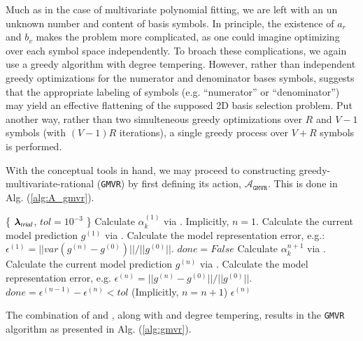 \documentclass[twocolumn,aps,prd,floatfix,preprintnumbers,a4paper,nofootinbib,
superscriptaddress,10pt]{revtex4-1}
\def\gmvr#1{greedy-multivariate-rational#1
  (\texttt{GMVR}#1)\gdef\gmvr{\texttt{GMVR}}}
\begin{document}
%
\par Much as in the case of multivariate polynomial fitting, we are left with an un unknown number and content of basis symbols.
%
In principle, the existence of $a_r$ and $b_v$ makes the problem more complicated, as one could imagine optimizing over each symbol space independently.
%
To broach these complications, we again use a greedy algorithm with degree tempering.
%
However, rather than independent greedy optimizations for the numerator and denominator bases symbols,  suggests that the appropriate labeling of symbols (e.g. ``numerator'' or ``denominator'') may yield an effective flattening of the supposed 2D basis selection problem.
%
Put another way, rather than two simulteneous greedy optimizations over $R$ and $V-1$ symbols (with $(V-1)R$ iterations), a single greedy process over $V+R$ symbols is performed.
%
\par With the conceptual tools in hand, we may proceed to constructing \gmvr{} by first defining its action, $\mathcal{A}_{\gmvr}$.
%
This is done in Alg. (\ref{alg:A_gmvr}).
%
\hspace{1cm}
{\scriptsize
\begin{algorithm}[H]
  \caption{$\mathcal{A}_{\gmvr}$, the action for \gmvr. Model calculation given basis symbols, and output of model error estimate.}
  \label{alg:A_gmvr}
  \begin{algorithmic}[1]
     \{ ${\bm{\lambda}}_{trial}$, $tol=10^{-3}$ \}
    \vskip 10pt
    \State Calculate $\alpha^{(1)}_k$ via . Implicitly, $n=1$.
    \State Calculate the current model prediction $g^{(1)}$ via .
    \State Calculate the model representation error, e.g.: $\epsilon^{(1)}  = ||var(g^{(n)} - g^{(0)})||/||g^{(0)}||$.
    \State $done = False$
      \State Calculate $\alpha^{n+1}_{k}$  via .
      \State Calculate the current model prediction $g^{(n)}$ via .
      \State Calculate the model representation error, e.g. $\epsilon^{(n)} = ||g^{(n)} - g^{(0)}||/||g^{(0)}||$.
      \State $done = \epsilon^{(n-1)}-\epsilon^{(n)} < tol$
      \State (Implicitly, $n = n+1$)
    \EndWhile
    \vskip 10pt
     $\epsilon^{(n)}$
  \end{algorithmic}
\end{algorithm}
}
%
\par The combination of  and , along with \pgreedy{} and degree tempering, results in the \gmvr{} algorithm as presented in Alg. (\ref{alg:gmvr}).
\end{document}
